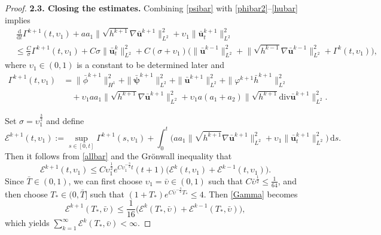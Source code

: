 \documentclass[10pt,a4paper]{amsart}
\begin{document}
\begin{proof}
\textbf{2.3. Closing the estimates.} Combining \eqref{psibar} with \eqref{phibar2}--\eqref{hubar} implies 
\begin{equation}\label{allbar}
\begin{aligned}
&\,\frac{\mathrm{d}}{\mathrm{d}t}\varGamma^{k+1}(t,\upsilon_1) +a a_1\|\sqrt{h^{k+1}}\nabla\bar{\boldsymbol{u}}^{k+1}\|^2_{L^2}+\upsilon_1\|\bar{\boldsymbol{u}}_t^{k+1}\|^2_{L^2}\\
&\leq \frac{C}{\sigma}\varGamma^{k+1}(t,\upsilon_1) \!+\!C\sigma\|\bar{\boldsymbol{u}}^k_t\|_{L^2}^2\! +\!C(\sigma+\upsilon_1)\big(\|\bar{\boldsymbol{u}}^{k-1}\|^2_{L^2}\!+\!\|\sqrt{h^{k-1}}\nabla\bar{\boldsymbol{u}}^{k-1}\|^2_{L^2}\!+\!\varGamma^{k}(t,\upsilon_1)\big),
\end{aligned}
\end{equation}
where $\upsilon_1\in (0,1)$ is a constant to be determined later and
\begin{equation*}
\begin{aligned}
\varGamma^{k+1}(t,\upsilon_1)&=  \|\bar\phi^{k+1}\|_{H^1}^2+ \|\bar{\boldsymbol{\psi}}^{k+1}\|_{L^2}^2+ \|\bar{\boldsymbol{u}}^{k+1}\|_{L^2}^2+\|\varphi^{k+1}\bar{h}^{k+1}\|^2_{L^2}\\
&\quad+\upsilon_1 a a_1\|\sqrt{h^{k+1}}\nabla\bar{\boldsymbol{u}}^{k+1}\|^2_{L^2}
+\upsilon_1 a(a_1+a_2)\|\sqrt{h^{k+1}}\mathrm{div}\bar{\boldsymbol{u}}^{k+1}\|^2_{L^2}.
\end{aligned}
\end{equation*}

Set $\sigma=\upsilon_1^{\frac{3}{2}}$ and define
\begin{equation*}
\mathcal{E}^{k+1}(t,\upsilon_1):=\sup_{s\in [0,t]}\varGamma^{k+1}(s,\upsilon_1)+\int^t_0\big(aa_1\|\sqrt{h^{k+1}}\nabla\bar{\boldsymbol{u}}^{k+1}\|^2_{L^2}+\upsilon_1\|\bar{\boldsymbol{u}}^{k+1}_t\|^2_{L^2}\big)\,\mathrm{d}s.
\end{equation*}
Then it follows from \eqref{allbar}  and the Gr\"onwall inequality  that 
\begin{equation}\label{Gamma}
\mathcal{E}^{k+1}(t,\upsilon_1)\leq C\upsilon^{\frac{1}{2}}_1 e^{C\upsilon_1^{-\frac{3}{2}}t}(t+1)\big(\mathcal{E}^{k}(t,\upsilon_1)+\mathcal{E}^{k-1}(t,\upsilon_1)\big).
\end{equation}
Since $\bar{T}\in (0,1)$, we can first choose   $\upsilon_1=\bar{\upsilon}\in (0,1)$ such that
$C\bar{\upsilon}^{\frac{1}{2}}\leq \frac{1}{64}$, and then choose  $T_*\in (0,\bar{T}]$ such that
$(1+T_*)e^{C\bar{\upsilon}^{-\frac{3}{2}}T_*}\leq 4$. Then \eqref{Gamma} becomes
\begin{equation*}
\mathcal{E}^{k+1}(T_*,\bar\upsilon)\leq \frac{1}{16}\big(\mathcal{E}^{k}(T_*,\bar\upsilon)+\mathcal{E}^{k-1}(T_*,\bar\upsilon)\big),    
\end{equation*}
which yields $\sum_{k=1}^{\infty}\mathcal{E}^{k}(T_*,\bar\upsilon)<\infty$.




\end{proof}
\end{document}
